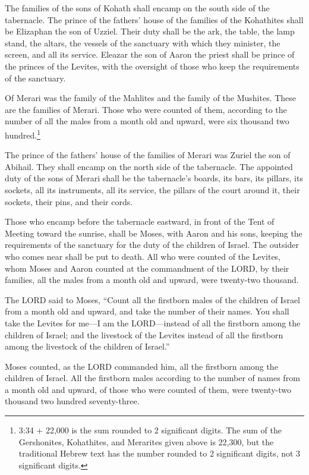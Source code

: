 \myverse{}The families of the sons of Kohath shall encamp on the south
side of the tabernacle.
\myverse{}The prince of the fathers’ house of the families of the Kohathites shall be
Elizaphan the son of Uzziel.
\myverse{}Their duty shall be the ark, the table, the lamp stand, the altars, the vessels
of the sanctuary with which they minister, the screen, and all its service.
\myverse{}Eleazar the son of Aaron the priest shall be prince of the princes of the
Levites, with the oversight of those who keep the requirements of the sanctuary.


\myverse{}Of Merari was the family of the Mahlites and the family of the
Mushites. These are the families of Merari.
\myverse{}Those who were counted of them, according to the number of all the males from
a month old and upward, were six thousand two hundred.\footnote{ 3:34 + 22,000 is the sum rounded to 2 significant digits. The sum of the Gershonites, Kohathites,
	and Merarites given above is 22,300, but the traditional Hebrew text has the number rounded to 2 significant
	digits, not 3 significant digits.}


\myverse{}The prince of the fathers’ house of the families of Merari was
Zuriel the son of Abihail. They shall encamp on the north side of the tabernacle.
\myverse{}The appointed duty of the sons of Merari shall be the tabernacle’s boards,
its bars, its pillars, its sockets, all its instruments, all its service,
\myverse{}the pillars of the court around it, their sockets, their pins, and their cords.


\myverse{}Those who encamp before the tabernacle eastward, in front of
the Tent of Meeting toward the sunrise, shall be Moses, with Aaron and his sons, keeping the requirements
of the sanctuary for the duty of the children of Israel. The outsider who comes near shall be put to death.
\myverse{}All who were counted of the Levites, whom Moses and Aaron counted at the commandment
of the LORD, by their families, all the males from a month old and upward, were twenty-two thousand.


\myverse{}The LORD said to Moses, “Count all the firstborn males of the
children of Israel from a month old and upward, and take the number of their names.
\myverse{}You shall take the Levites for me—I am the LORD—instead of all the firstborn
among the children of Israel; and the livestock of the Levites instead of all the firstborn among the
livestock of the children of Israel.”


\myverse{}Moses counted, as the LORD commanded him, all the firstborn among
the children of Israel.
\myverse{}All the firstborn males according to the number of names from a month old
and upward, of those who were counted of them, were twenty-two thousand two hundred seventy-three.


